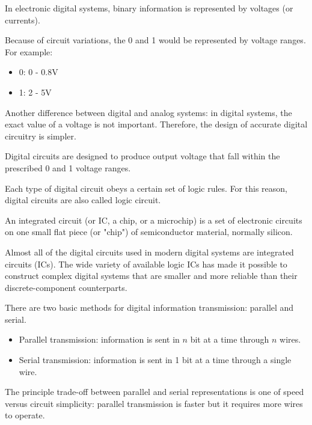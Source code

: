     \par In electronic digital systems, binary information is represented by voltages (or
    currents).
    \par Because of circuit variations, the 0 and 1 would be represented by voltage ranges.
    For example:
    \begin{itemize}
        \item 0: 0 - 0.8V
        \item 1: 2 - 5V
    \end{itemize}
    \par Another difference between digital and analog systems: in digital systems, the exact
    value of a voltage is not important. Therefore, the design of accurate digital circuitry is
    simpler.

        \par Digital circuits are designed to produce output voltage that fall within the
        prescribed 0 and 1 voltage ranges.
        \par Each type of digital circuit obeys a certain set of logic rules. For this reason, 
        digital circuits are also called logic circuit.
        \par An integrated circuit (or IC, a chip, or a microchip) is a set of electronic
        circuits on one small flat piece (or "chip") of semiconductor material, normally silicon.
        \par Almost all of the digital circuits used in modern digital systems are integrated
        circuits (ICs). The wide variety of available logic ICs has made it possible to construct
        complex digital systems that are smaller and more reliable than their discrete-component
        counterparts.

    \par There are two basic methods for digital information transmission: parallel and serial.
    \begin{itemize}
        \item Parallel transmission: information is sent in $n$ bit at a time through $n$ wires.
        \item Serial transmission: information is sent in 1 bit at a time through a single wire.
    \end{itemize}
    \par The principle trade-off between parallel and serial representations is one of speed
    versus circuit simplicity: parallel transmission is faster but it requires more wires to
    operate.

